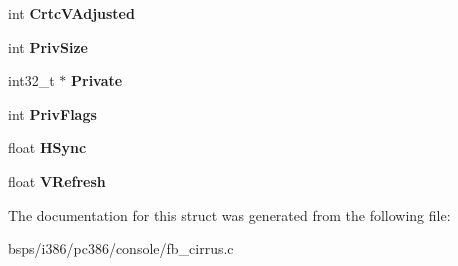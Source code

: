 \begin{DoxyCompactItemize}
int {\bfseries Crtc\+V\+Adjusted}
\item 
\mbox{\label{struct__DisplayModeRec_aac4580aa7f34f62f09dab30cf9aebe2e}} 
int {\bfseries Priv\+Size}
\item 
\mbox{\label{struct__DisplayModeRec_a672051fcf5f7f7e0b4dd20c70e5ccf5d}} 
int32\+\_\+t $\ast$ {\bfseries Private}
\item 
\mbox{\label{struct__DisplayModeRec_af1f2f71475337f1c4fb14ed96cb08ff0}} 
int {\bfseries Priv\+Flags}
\item 
\mbox{\label{struct__DisplayModeRec_a53b7dea624dffaff71d3f7b9ad1bb821}} 
float {\bfseries H\+Sync}
\item 
\mbox{\label{struct__DisplayModeRec_a5a94deabccfbb5c2275bfa1bdecd7aea}} 
float {\bfseries V\+Refresh}
\end{DoxyCompactItemize}


The documentation for this struct was generated from the following file\+:\begin{DoxyCompactItemize}
\item 
bsps/i386/pc386/console/fb\+\_\+cirrus.\+c\end{DoxyCompactItemize}
